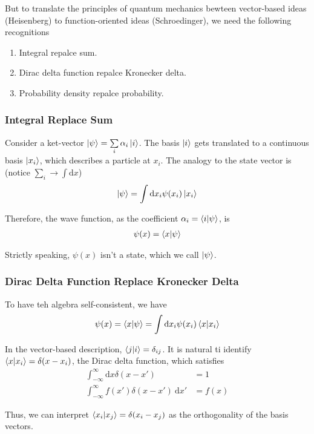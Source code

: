 But to translate the principles of quantum mechanics bewteen vector-based ideas (Heisenberg) to function-oriented ideas (Schroedinger), we need the following recognitions
\begin{enumerate}
    \item Integral repalce sum.
    \item Dirac delta function repalce Kronecker delta.
    \item Probability density repalce probability. 
\end{enumerate}

\subsubsection{Integral Replace Sum}
Consider a ket-vector $\ket{\psi}=\sum\limits_i \alpha_i\ket{i}$. The basis $\ket{i}$ gets translated to a continuous basis $\ket{x_i}$, which describes a particle at $x_i$. The analogy to the state vector is (notice $\sum\limits_i \rightarrow \int \mathrm{d}x$)
\begin{align*}
    \ket{\psi}=\int \mathrm{d}x_i\psi(x_i) \ket{x_i}
\end{align*}

Therefore, the wave function, as the coefficient $\alpha_i=\braket{i|\psi}$, is 
\begin{align*}
    \psi(x)=\braket{x|\psi}
\end{align*}

Strictly speaking, $\psi(x)$ isn't a state, which we call $\ket{\psi}$. 

\subsubsection{Dirac Delta Function Replace Kronecker Delta}
To have teh algebra self-consistent, we have
\begin{align*}
    \psi(x)=\braket{x|\psi}=\int \mathrm{d}x_i\psi(x_i)\braket{x|x_i}
\end{align*}

In the vector-based description, $\braket{j|i}=\delta_{ij}$. It is natural ti identify $\braket{x|x_i}=\delta(x-x_i)$, the Dirac delta function, which satisfies
\begin{align*}
    \int_{-\infty}^{\infty}\mathrm{d}x\delta(x-x')&=1\\
    \int_{-\infty}^{\infty}f(x')\delta(x-x')\ \mathrm{d}x'&=f(x)
\end{align*}

Thus, we can interpret $\braket{x_i|x_j}=\delta(x_i-x_j)$ as the orthogonality of the basis vectors. 

